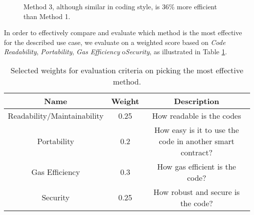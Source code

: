 \begin{figure}[ht!]
    \caption{Method 3, although similar in coding style, is 36\% more efficient than Method 1.}
    \label{fig:method3}

\end{figure}

In order to effectively compare and evaluate which method is the most effective for the described use case, we evaluate on a weighted score based on \textit{Code Readability}, \textit{Portability}, \textit{Gas Efficiency} o\textit{Security}, as illustrated in Table \ref{table:weights}.

\begin{table}[H]
	\centering
	\vspace*{-1ex}
	\scriptsize
	\vspace{-1ex}
	\begin{tabular}{|c|c|c|}
        \hline
        \textbf{Name} & \textbf{Weight}  & \textbf{Description}\\ \hline 
        Readability/Maintainability & 0.25 & How readable is the codes\\
        Portability & 0.2 & How easy is it to use the code in another smart contract? \\
        Gas Efficiency & 0.3 & How gas efficient is the code? \\
        Security & 0.25 & How robust and secure is the code? \\
        \hline
    \end{tabular}
	\caption{Selected weights for evaluation criteria on picking the most effective method.}
    \label{table:weights}
\end{table}

